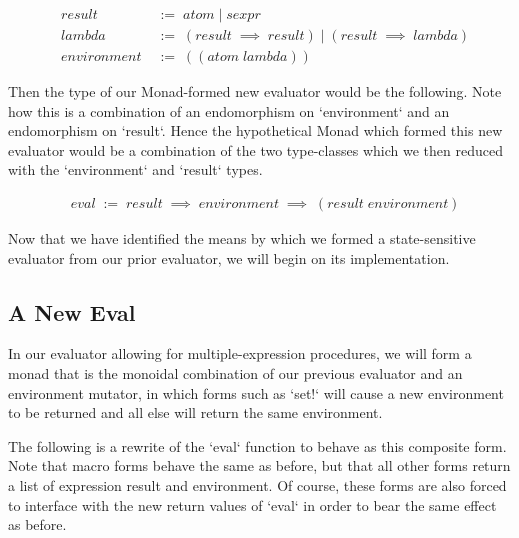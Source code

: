 \begin{align*}
& result \; &:= \; atom \; | \; sexpr
\\& lambda \; &:= \; (result \; \implies \; result) \; | \; (result \; \implies \; lambda)
\\& environment \; &:= \; ((atom \; lambda))
\end{align*}

Then the type of our Monad-formed new evaluator would be the following. Note
how this is a combination of an endomorphism on `environment` and an 
endomorphism on `result`. Hence the hypothetical Monad which formed this new
evaluator would be a combination of the two type-classes which we then
reduced with the `environment` and `result` types.

\begin{align*}
& eval \; := \; result \; \implies \; environment \; \implies \; (result \; environment)
\end{align*}

Now that we have identified the means by which we formed a state-sensitive
evaluator from our prior evaluator, we will begin on its implementation.

\subsection{A New Eval}
In our evaluator allowing for multiple-expression procedures, we will form a 
monad that is the monoidal combination of our previous evaluator and an 
environment mutator, in which forms such as `set!` will cause a new
environment to be returned and all else will return the same environment.

The following is a rewrite of the `eval` function to behave as this composite
form. Note that macro forms behave the same as before, but that all other
forms return a list of expression result and environment. Of course, these
forms are also forced to interface with the new return values of `eval` in
order to bear the same effect as before.

